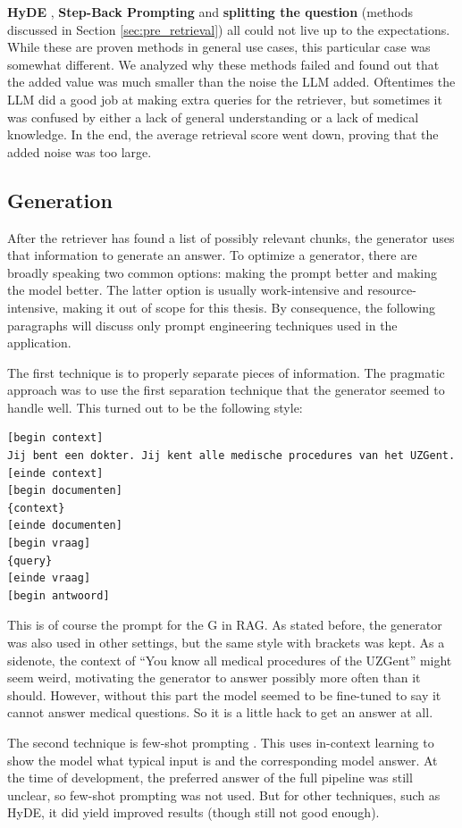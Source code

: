 \textbf{HyDE} \cite{gao2023precisehyde}, \textbf{Step-Back Prompting} \cite{zheng2023takeastepback} and \textbf{splitting the question} (methods discussed in Section \ref{sec:pre_retrieval}) all could not live up to the expectations. While these are proven methods in general use cases, this particular case was somewhat different. We analyzed why these methods failed and found out that the added value was much smaller than the noise the LLM added. Oftentimes the LLM did a good job at making extra queries for the retriever, but sometimes it was confused by either a lack of general understanding or a lack of medical knowledge. In the end, the average retrieval score went down, proving that the added noise was too large.

\subsection{Generation}
After the retriever has found a list of possibly relevant chunks, the generator uses that information to generate an answer. To optimize a generator, there are broadly speaking two common options: making the prompt better and making the model better. The latter option is usually work-intensive and resource-intensive, making it out of scope for this thesis. By consequence, the following paragraphs will discuss only prompt engineering techniques used in the application.

The first technique is to properly separate pieces of information. The pragmatic approach was to use the first separation technique that the generator seemed to handle well. This turned out to be the following style:
\begin{verbatim}
[begin context]
Jij bent een dokter. Jij kent alle medische procedures van het UZGent.
[einde context]
[begin documenten]
{context}
[einde documenten]
[begin vraag]
{query}
[einde vraag]
[begin antwoord]
\end{verbatim}
This is of course the prompt for the G in RAG. As stated before, the generator was also used in other settings, but the same style with brackets was kept. As a sidenote, the context of ``You know all medical procedures of the UZGent'' might seem weird, motivating the generator to answer possibly more often than it should. However, without this part the model seemed to be fine-tuned to say it cannot answer medical questions. So it is a little hack to get an answer at all.

The second technique is few-shot prompting \cite{brown2020language}. This uses in-context learning to show the model what typical input is and the corresponding model answer. At the time of development, the preferred answer of the full pipeline was still unclear, so few-shot prompting was not used. But for other techniques, such as HyDE, it did yield improved results (though still not good enough). 

